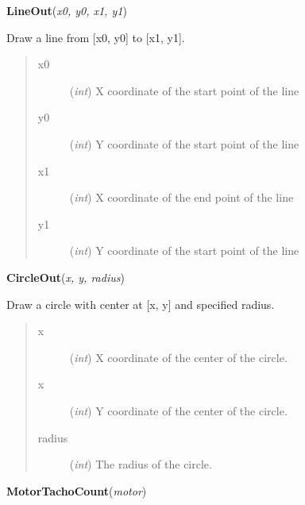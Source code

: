 \documentclass[10pt,a4paper]{article}
\begin{document}
 

\vspace{6pt}
{\bf LineOut}({\it x0, y0, x1, y1}) 
    
    Draw a line from [x0, y0] to [x1, y1].








\begin{quote}
    \begin{description}
        
\item[x0] ({\emph{int}}) X coordinate of the start point of the line

\item[y0] ({\emph{int}}) Y coordinate of the start point of the line

\item[x1] ({\emph{int}}) X coordinate of the end point of the line

\item[y1] ({\emph{int}}) Y coordinate of the start point of the line

    \end{description}
\end{quote}

 

\vspace{6pt}
{\bf CircleOut}({\it x, y, radius}) 

    Draw a circle with center at [x, y] and specified radius.







\begin{quote}
    \begin{description}
        
\item[x] ({\emph{int}}) X coordinate of the center of the circle.

\item[x] ({\emph{int}}) Y coordinate of the center of the circle.

\item[radius] ({\emph{int}}) The radius of the circle.

    \end{description}
\end{quote}

 

\vspace{6pt}
{\bf MotorTachoCount}({\it motor}) 
    
\end{document}

